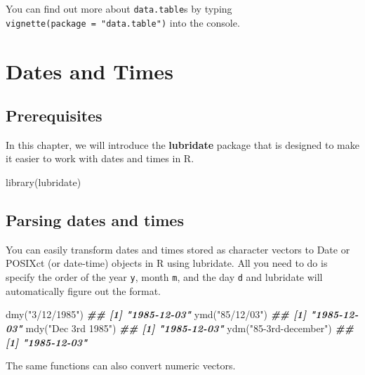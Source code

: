 \documentclass[
]{book}
\newenvironment{Shaded}{\begin{snugshade}}{\end{snugshade}}
\newcommand{\DocumentationTok}[1]{\textcolor[rgb]{0.56,0.35,0.01}{\textbf{\textit{#1}}}}
\newcommand{\FunctionTok}[1]{\textcolor[rgb]{0.00,0.00,0.00}{#1}}
\newcommand{\NormalTok}[1]{#1}
\newcommand{\StringTok}[1]{\textcolor[rgb]{0.31,0.60,0.02}{#1}}
\begin{document}
You can find out more about \texttt{data.table}s by typing \texttt{vignette(package\ =\ "data.table")} into the console.

\hypertarget{dates-and-times}{%
\chapter{Dates and Times}\label{dates-and-times}}

\hypertarget{prerequisites-2}{%
\section{Prerequisites}\label{prerequisites-2}}

In this chapter, we will introduce the \textbf{lubridate} package that is designed to make it easier to work with dates and times in R.

\begin{Shaded}
\begin{Highlighting}[]
\FunctionTok{library}\NormalTok{(lubridate)}
\end{Highlighting}
\end{Shaded}

\hypertarget{parsing-dates-and-times}{%
\section{Parsing dates and times}\label{parsing-dates-and-times}}

You can easily transform dates and times stored as character vectors to Date or POSIXct (or date-time) objects in R using lubridate. All you need to do is specify the order of the year \texttt{y}, month \texttt{m}, and the day \texttt{d} and lubridate will automatically figure out the format.

\begin{Shaded}
\begin{Highlighting}[]
\FunctionTok{dmy}\NormalTok{(}\StringTok{"3/12/1985"}\NormalTok{)}
\DocumentationTok{\#\# [1] "1985{-}12{-}03"}
\FunctionTok{ymd}\NormalTok{(}\StringTok{"85/12/03"}\NormalTok{)}
\DocumentationTok{\#\# [1] "1985{-}12{-}03"}
\FunctionTok{mdy}\NormalTok{(}\StringTok{"Dec 3rd 1985"}\NormalTok{)}
\DocumentationTok{\#\# [1] "1985{-}12{-}03"}
\FunctionTok{ydm}\NormalTok{(}\StringTok{"85{-}3rd{-}december"}\NormalTok{)}
\DocumentationTok{\#\# [1] "1985{-}12{-}03"}
\end{Highlighting}
\end{Shaded}

The same functions can also convert numeric vectors.
\end{document}
